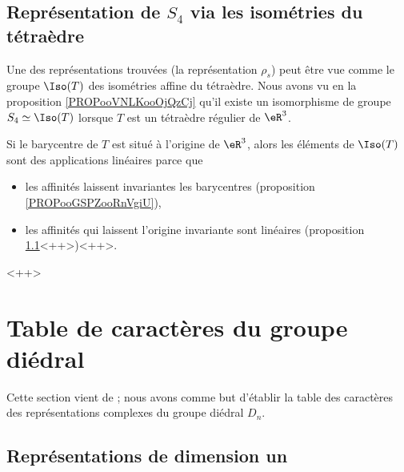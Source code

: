 \subsection{Représentation de \( S_4\) via les isométries du tétraèdre}
\label{SUBSECooLEUAooGGjGIZ}

Une des représentations trouvées (la représentation \( \rho_s\)) peut être vue comme le groupe \( \Iso(T)\) des isométries affine du tétraèdre. Nous avons vu en la proposition \ref{PROPooVNLKooOjQzCj} qu'il existe un isomorphisme de groupe \( S_4\simeq \Iso(T)\) lorsque \( T\) est un tétraèdre régulier de \( \eR^3\).

Si le barycentre de \( T\) est situé à l'origine de \( \eR^3\), alors les éléments de \( \Iso(T)\) sont des applications linéaires parce que
\begin{itemize}
    \item les affinités laissent invariantes les barycentres (proposition \ref{PROPooGSPZooRnVgiU}),
    \item les affinités qui laissent l'origine invariante sont linéaires (proposition \ref{}<++>)<++>.
\end{itemize}
<++>


\section{Table de caractères du groupe diédral}
\label{SecWMzheKf}
Cette section vient de \cite{KXjFWKA}; nous avons comme but d'établir la table des caractères des représentations complexes du groupe diédral \( D_n\).

\subsection{Représentations de dimension un}

